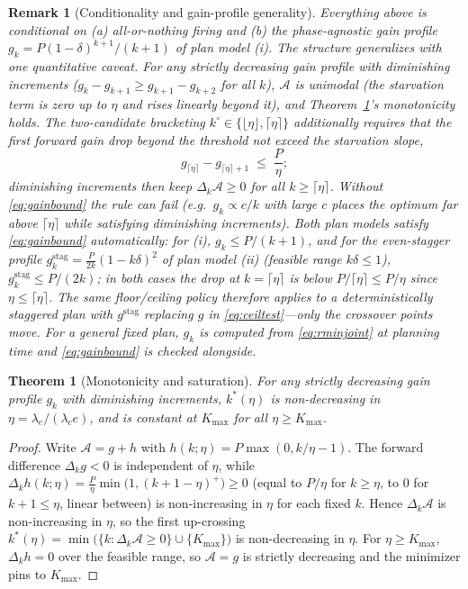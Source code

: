 \documentclass[twocolumn,3p,times,procedia]{elsarticle}
\newtheorem{theorem}{Theorem}
\newtheorem{remark}{Remark}
\newcommand{\kstar}{k^{\ast}}
\begin{document}
\begin{remark}[Conditionality and gain-profile generality]
\label{rem:gainprofile}
Everything above is conditional on (a) \emph{all-or-nothing} firing and
(b) the \emph{phase-agnostic} gain profile
$g_k=P(1-\delta)^{k+1}/(k+1)$ of plan model (i). The structure
generalizes with one quantitative caveat. For any strictly decreasing
gain profile with diminishing increments ($g_k-g_{k+1}\ge
g_{k+1}-g_{k+2}$ for all $k$), $\mathcal{A}$ is unimodal
(the starvation term is zero up to $\eta$ and rises linearly beyond
it), and Theorem~\ref{thm:r3}'s monotonicity holds. The
\emph{two-candidate bracketing} $k^\circ\in\{\lfloor\eta\rfloor,
\lceil\eta\rceil\}$ additionally requires that the first forward gain
drop beyond the threshold not exceed the starvation slope,
\begin{equation}\label{eq:gainbound}
g_{\lceil\eta\rceil}-g_{\lceil\eta\rceil+1}\;\le\;\frac{P}{\eta};
\end{equation}
diminishing increments then keep $\Delta_k\mathcal{A}\ge0$ for all
$k\ge\lceil\eta\rceil$. Without \eqref{eq:gainbound} the rule can fail
(e.g.\ $g_k\propto c/k$ with large $c$ places the optimum far above
$\lceil\eta\rceil$ while satisfying diminishing increments). Both plan
models satisfy \eqref{eq:gainbound} automatically: for (i), $g_k\le
P/(k+1)$, and for the even-stagger profile
$g^{\mathrm{stag}}_k=\tfrac{P}{2k}(1-k\delta)^2$ of plan model (ii)
(feasible range $k\delta\le1$), $g^{\mathrm{stag}}_k\le P/(2k)$; in
both cases the drop at $k=\lceil\eta\rceil$ is below
$P/\lceil\eta\rceil\le P/\eta$ since
$\eta\le\lceil\eta\rceil$. The same floor/ceiling policy therefore
applies to a deterministically staggered plan with $g^{\mathrm{stag}}$
replacing $g$ in \eqref{eq:ceiltest}---only the crossover points move.
For a general fixed plan, $g_k$ is computed from \eqref{eq:rminjoint}
at planning time and \eqref{eq:gainbound} is checked alongside.
\end{remark}

\begin{theorem}[Monotonicity and saturation]\label{thm:r3}
For any strictly decreasing gain profile $g_k$ with diminishing
increments, $\kstar(\eta)$ is non-decreasing in
$\eta=\lambda_e/(\lambda_c e)$, and is
constant at $K_{\max}$ for all $\eta\ge K_{\max}$.
\end{theorem}
\begin{proof}
Write $\mathcal{A}=g+h$ with
$h(k;\eta)=P\max(0,k/\eta-1)$. The forward difference $\Delta_k g<0$ is
independent of $\eta$, while
$\Delta_k h(k;\eta)=\tfrac{P}{\eta}\min\bigl(1,(k{+}1-\eta)^+\bigr)\ge0$
(equal to $P/\eta$ for $k\ge\eta$, to $0$ for $k{+}1\le\eta$, linear
between) is non-increasing in $\eta$ for each fixed $k$. Hence
$\Delta_k\mathcal{A}$ is non-increasing in $\eta$, so the first
up-crossing $\kstar(\eta)=\min\bigl(\{k:\Delta_k\mathcal{A}\ge0\}
\cup\{K_{\max}\}\bigr)$ is
non-decreasing in $\eta$. For $\eta\ge K_{\max}$, $\Delta_k h=0$ over the
feasible range, so $\mathcal{A}=g$ is strictly decreasing and the
minimizer pins to $K_{\max}$.
\end{proof}
\end{document}
